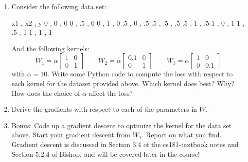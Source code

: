\documentclass[submit]{harvardml}
\begin{document}
\begin{problem}
\begin{enumerate}
\item Consider the following data set:
\begin{csv}
x1 , x2 , y 
  0 , 0 , 0
  0 , .5 , 0
  0 , 1 , 0 
  .5 , 0 , .5
  .5 , .5 , .5
  .5 , 1 , .5
  1 , 0 , 1
  1 , .5 , 1
  1 , 1 , 1 
\end{csv}
And the following kernels:
\begin{equation*} 
W_1 = \alpha \begin{bmatrix}
  1 & 0 \\
  0 & 1 
\end{bmatrix}
\qquad
W_2 = \alpha \begin{bmatrix}
  0.1 & 0 \\
  0 & 1 
\end{bmatrix}
\qquad
W_3 = \alpha \begin{bmatrix}
  1 & 0 \\
  0 & 0.1 
\end{bmatrix}
\end{equation*} 
with $\alpha = 10$. Write some Python code to compute the loss with respect
to each kernel for the dataset provided above. Which kernel does best?  Why?  How does the choice of $\alpha$ affect the loss?  

\item Derive the gradients with respect to each of the parameters in
  $W$.

\item Bonus:  Code up a gradient descent to
  optimize the kernel for the data set above.  Start your gradient
  descent from $W_1$.  Report on what you find.\\
  Gradient descent is discussed in Section 3.4 of the cs181-textbook notes and Section 5.2.4 of Bishop, and will be covered later in the course! 

\end{enumerate}
  
\end{problem}  


\newpage

\end{document}
